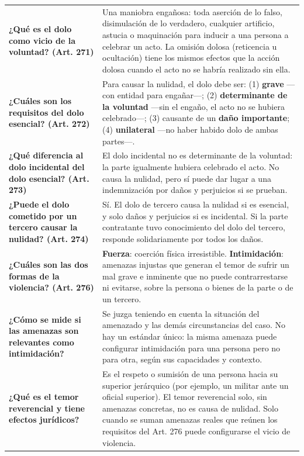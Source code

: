 \documentclass[12pt,oneside]{book}
\begin{document}
\begin{longtable}{@{}     >{\raggedright\arraybackslash}p{}     >{\raggedright\arraybackslash}p{} @{}}
\textbf{¿Qué es el dolo como vicio de la voluntad? (Art. 271)} &
Una maniobra engañosa: toda aserción de lo falso, disimulación de lo verdadero, cualquier artificio, astucia o maquinación para inducir a una persona a celebrar un acto. La omisión dolosa (reticencia u ocultación) tiene los mismos efectos que la acción dolosa cuando el acto no se habría realizado sin ella. \\[6pt]

\textbf{¿Cuáles son los requisitos del dolo esencial? (Art. 272)} &
Para causar la nulidad, el dolo debe ser: (1) \textbf{grave} ---con entidad para engañar---; (2) \textbf{determinante de la voluntad} ---sin el engaño, el acto no se hubiera celebrado---; (3) causante de un \textbf{daño importante}; (4) \textbf{unilateral} ---no haber habido dolo de ambas partes---. \\[6pt]

\textbf{¿Qué diferencia al dolo incidental del dolo esencial? (Art. 273)} &
El dolo incidental no es determinante de la voluntad: la parte igualmente hubiera celebrado el acto. No causa la nulidad, pero sí puede dar lugar a una indemnización por daños y perjuicios si se prueban. \\[6pt]

\textbf{¿Puede el dolo cometido por un tercero causar la nulidad? (Art. 274)} &
Sí. El dolo de tercero causa la nulidad si es esencial, y solo daños y perjuicios si es incidental. Si la parte contratante tuvo conocimiento del dolo del tercero, responde solidariamente por todos los daños. \\[6pt]

\textbf{¿Cuáles son las dos formas de la violencia? (Art. 276)} &
\textbf{Fuerza}: coerción física irresistible. \textbf{Intimidación}: amenazas injustas que generan el temor de sufrir un mal grave e inminente que no puede contrarrestarse ni evitarse, sobre la persona o bienes de la parte o de un tercero. \\[6pt]

\textbf{¿Cómo se mide si las amenazas son relevantes como intimidación?} &
Se juzga teniendo en cuenta la situación del amenazado y las demás circunstancias del caso. No hay un estándar único: la misma amenaza puede configurar intimidación para una persona pero no para otra, según sus capacidades y contexto. \\[6pt]

\textbf{¿Qué es el temor reverencial y tiene efectos jurídicos?} &
Es el respeto o sumisión de una persona hacia su superior jerárquico (por ejemplo, un militar ante un oficial superior). El temor reverencial solo, sin amenazas concretas, no es causa de nulidad. Solo cuando se suman amenazas reales que reúnen los requisitos del Art. 276 puede configurarse el vicio de violencia. \\[6pt]


\end{longtable}
\end{document}
